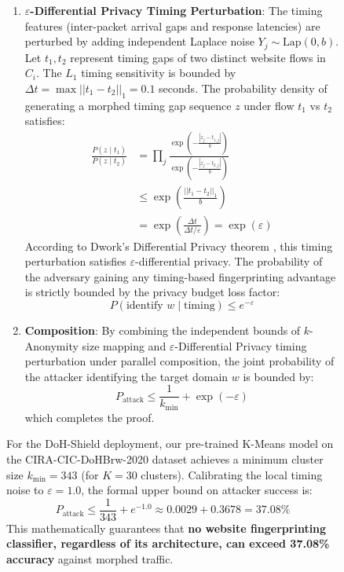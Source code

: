 \documentclass[10pt,journal,compsoc,twocolumn]{IEEEtran}
\begin{document}
\begin{figure}[t]
\begin{IEEEproof}
\begin{enumerate}
    \item \textbf{$\varepsilon$-Differential Privacy Timing Perturbation}: The timing features (inter-packet arrival gaps and response latencies) are perturbed by adding independent Laplace noise $Y_j \sim \text{Lap}(0, b)$. Let $t_1, t_2$ represent timing gaps of two distinct website flows in $C_i$. The $L_1$ timing sensitivity is bounded by $\Delta t = \max ||t_1 - t_2||_1 = 0.1$ seconds. The probability density of generating a morphed timing gap sequence $z$ under flow $t_1$ vs $t_2$ satisfies:
    \begin{align}
    \frac{P(z \mid t_1)}{P(z \mid t_2)} &= \prod_j \frac{\exp\left(-\frac{|z_j - t_{1,j}|}{b}\right)}{\exp\left(-\frac{|z_j - t_{2,j}|}{b}\right)} \\
    &\le \exp\left(\frac{||t_1 - t_2||_1}{b}\right) \\
    &= \exp\left(\frac{\Delta t}{\Delta t / \varepsilon}\right) = \exp(\varepsilon)
    \end{align}
    According to Dwork's Differential Privacy theorem \cite{dwork2006}, this timing perturbation satisfies $\varepsilon$-differential privacy. The probability of the adversary gaining any timing-based fingerprinting advantage is strictly bounded by the privacy budget loss factor:
    \begin{equation}
    P(\text{identify } w \mid \text{timing}) \le e^{-\varepsilon}
    \end{equation}

    \item \textbf{Composition}: By combining the independent bounds of $k$-Anonymity size mapping and $\varepsilon$-Differential Privacy timing perturbation under parallel composition, the joint probability of the attacker identifying the target domain $w$ is bounded by:
    \begin{equation}
    P_{\text{attack}} \le \frac{1}{k_{\min}} + \exp(-\varepsilon)
    \end{equation}
    which completes the proof.
\end{enumerate}
\end{IEEEproof}

For the DoH-Shield deployment, our pre-trained K-Means model on the CIRA-CIC-DoHBrw-2020 dataset achieves a minimum cluster size $k_{\min} = 343$ (for $K = 30$ clusters). Calibrating the local timing noise to $\varepsilon = 1.0$, the formal upper bound on attacker success is:
\begin{equation}
P_{\text{attack}} \le \frac{1}{343} + e^{-1.0} \approx 0.0029 + 0.3678 = 37.08\%
\end{equation}
This mathematically guarantees that \textbf{no website fingerprinting classifier, regardless of its architecture, can exceed 37.08\% accuracy} against morphed traffic.


\end{figure}
\end{document}
